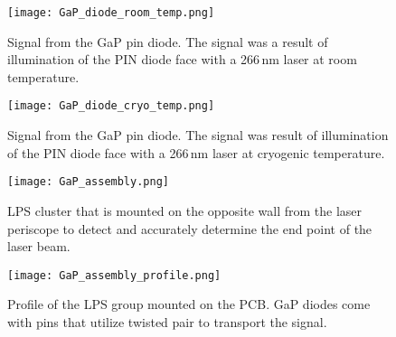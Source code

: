

\begin{figure}[htb!] 
\begin{minipage}[b]{0.47\textwidth}
\centering 
\texttt{[image: GaP\_diode\_room\_temp.png]} 
\caption{Signal from the GaP pin diode. The signal was a result of illumination of the PIN diode face with a 266\,nm laser at room temperature.}
\label{fig:LPS1} 
\end{minipage}
\hfill
\begin{minipage}[b]{0.47\textwidth}
\centering 
\texttt{[image: GaP\_diode\_cryo\_temp.png]} 
\caption{Signal from the GaP pin diode. The signal was result of illumination of the PIN diode face with a 266\,nm laser at cryogenic temperature.}
\label{fig:LPS2} 
\end{minipage}
\hfill
\end{figure} 

\begin{figure}[htb!] 
\begin{minipage}[b]{0.4\textwidth}
\centering 
\texttt{[image: GaP\_assembly.png]} 
\caption{LPS cluster that is mounted on the opposite wall from the laser periscope to detect and accurately determine the end point of the laser beam.}
\label{fig:pin1} 
\end{minipage}
\hfill
\begin{minipage}[b]{0.47\textwidth}
\centering 
\texttt{[image: GaP\_assembly\_profile.png]} 
\caption{Profile of the LPS group mounted on the PCB. GaP diodes come with pins that utilize twisted pair to transport the signal.}
\label{fig:pin2} 
\end{minipage}
\hfill
\end{figure} 

